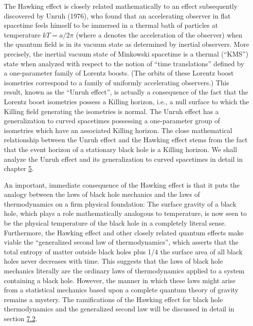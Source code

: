 \documentclass[11pt,a4paper]{article}
\begin{document}
The Hawking effect is closely related mathematically to an effect subsequently discovered by Unruh (1976), who found that an accelerating observer in flat spacetime feels himself to be immersed in a thermal bath of particles at temperature \(kT = a/2\pi\) (where a denotes the acceleration of the observer) when the quantum field is in its vacuum state as determined by inertial observers. More precisely, the inertial vacuum state of Minkowski spacetime is a thermal (``KMS'') state when analyzed with respect to the notion of ``time translations'' defined by a one-parameter family of Lorentz boosts. (The orbits of these Lorentz boost isometries correspond to a family of uniformly accelerating observers.) This result, known as the ``Unruh effect'', is actually a consequence of the fact that the Lorentz boost isometries possess a Killing horizon, i.e., a null surface to which the Killing field generating the isometries is normal. The Unruh effect has a generalization to curved spacetimes possessing a one-parameter group of isometries which have an associated Killing horizon. The close mathematical relationship between the Unruh effect and the Hawking effect stems from the fact that the \hypertarget{source-22}{} event horizon of a stationary black hole is a Killing horizon. We shall analyze the Unruh effect and its generalization to curved spacetimes in detail in chapter \hyperlink{sec:5}{5}.

An important, immediate consequence of the Hawking effect is that it puts the analogy between the laws of black hole mechanics and the laws of thermodynamics on a firm physical foundation: The surface gravity of a black hole, which plays a role mathematically analogous to temperature, is now seen to be the physical temperature of the black hole in a completely literal sense. Furthermore, the Hawking effect and other closely related quantum effects make viable the ``generalized second law of thermodynamics'', which asserts that the total entropy of matter outside black holes plus 1/4 the surface area of all black holes never decreases with time. This suggests that the laws of black hole mechanics literally are the ordinary laws of thermodynamics applied to a system containing a black hole. However, the manner in which these laws might arise from a statistical mechanics based upon a complete quantum theory of gravity remains a mystery. The ramifications of the Hawking effect for black hole thermodynamics and the generalized second law will be discussed in detail in section \hyperlink{sec:7.2}{7.2}.
\end{document}
